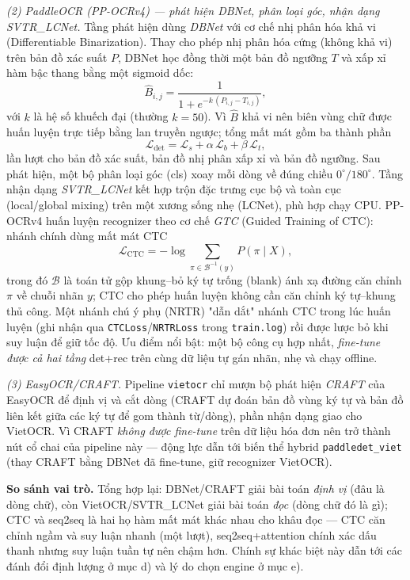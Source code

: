 \noindent\textit{(2) PaddleOCR (PP-OCRv4) — phát hiện DBNet, phân loại góc, nhận dạng SVTR\_LCNet.}
Tầng phát hiện dùng \emph{DBNet} với cơ chế nhị phân hóa khả vi (Differentiable Binarization). Thay cho phép nhị phân hóa cứng (không khả vi) trên bản đồ xác suất $P$, DBNet học đồng thời một bản đồ ngưỡng $T$ và xấp xỉ hàm bậc thang bằng một sigmoid dốc:
\[
  \hat{B}_{i,j} = \frac{1}{1 + e^{-k\,(P_{i,j} - T_{i,j})}},
\]
với $k$ là hệ số khuếch đại (thường $k=50$). Vì $\hat{B}$ khả vi nên biên vùng chữ được huấn luyện trực tiếp bằng lan truyền ngược; tổng mất mát gồm ba thành phần
\[
  \mathcal{L}_{\text{det}} = \mathcal{L}_{s} + \alpha\,\mathcal{L}_{b} + \beta\,\mathcal{L}_{t},
\]
lần lượt cho bản đồ xác suất, bản đồ nhị phân xấp xỉ và bản đồ ngưỡng. Sau phát hiện, một bộ phân loại góc (cls) xoay mỗi dòng về đúng chiều $0^{\circ}/180^{\circ}$. Tầng nhận dạng \emph{SVTR\_LCNet} kết hợp trộn đặc trưng cục bộ và toàn cục (local/global mixing) trên một xương sống nhẹ (LCNet), phù hợp chạy CPU. PP-OCRv4 huấn luyện recognizer theo cơ chế \emph{GTC} (Guided Training of CTC): nhánh chính dùng mất mát CTC
\[
  \mathcal{L}_{\text{CTC}} = -\log \!\!\sum_{\pi \in \mathcal{B}^{-1}(y)} \! P(\pi \mid X),
\]
trong đó $\mathcal{B}$ là toán tử gộp khung–bỏ ký tự trống (blank) ánh xạ đường căn chỉnh $\pi$ về chuỗi nhãn $y$; CTC cho phép huấn luyện không cần căn chỉnh ký tự–khung thủ công. Một nhánh chú ý phụ (NRTR) "dẫn dắt" nhánh CTC trong lúc huấn luyện (ghi nhận qua \texttt{CTCLoss}/\texttt{NRTRLoss} trong \texttt{train.log}) rồi được lược bỏ khi suy luận để giữ tốc độ. Ưu điểm nổi bật: một bộ công cụ hợp nhất, \emph{fine-tune được cả hai tầng} det+rec trên cùng dữ liệu tự gán nhãn, nhẹ và chạy offline.

\noindent\textit{(3) EasyOCR/CRAFT.}
Pipeline \texttt{vietocr} chỉ mượn bộ phát hiện \emph{CRAFT} của EasyOCR để định vị và cắt dòng (CRAFT dự đoán bản đồ vùng ký tự và bản đồ liên kết giữa các ký tự để gom thành từ/dòng), phần nhận dạng giao cho VietOCR. Vì CRAFT \emph{không được fine-tune} trên dữ liệu hóa đơn nên trở thành nút cổ chai của pipeline này — động lực dẫn tới biến thể hybrid \texttt{paddledet\_viet} (thay CRAFT bằng DBNet đã fine-tune, giữ recognizer VietOCR).

\noindent\textbf{So sánh vai trò.} Tổng hợp lại: DBNet/CRAFT giải bài toán \emph{định vị} (đâu là dòng chữ), còn VietOCR/SVTR\_LCNet giải bài toán \emph{đọc} (dòng chữ đó là gì); CTC và seq2seq là hai họ hàm mất mát khác nhau cho khâu đọc — CTC căn chỉnh ngầm và suy luận nhanh (một lượt), seq2seq+attention chính xác dấu thanh nhưng suy luận tuần tự nên chậm hơn. Chính sự khác biệt này dẫn tới các đánh đổi định lượng ở mục d) và lý do chọn engine ở mục e).
